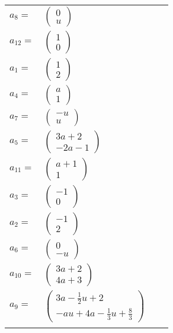\documentclass[1p]{elsarticle_modified}
\theoremstyle{definition}
\begin{document}
\begin{tabular}{m{7pt} m{180pt} m{7pt} m{180pt} }
\flushright $a_{8}=$&$\begin{pmatrix}0\\u\end{pmatrix}$ \\
\flushright $a_{12}=$&$\begin{pmatrix}1\\0\end{pmatrix}$ \\
\flushright $a_{1}=$&$\begin{pmatrix}1\\2\end{pmatrix}$ \\
\flushright $a_{4}=$&$\begin{pmatrix}a\\1\end{pmatrix}$ \\
\flushright $a_{7}=$&$\begin{pmatrix}- u\\u\end{pmatrix}$ \\
\flushright $a_{5}=$&$\begin{pmatrix}3 a+2\\-2 a-1\end{pmatrix}$ \\
\flushright $a_{11}=$&$\begin{pmatrix}a+1\\1\end{pmatrix}$ \\
\flushright $a_{3}=$&$\begin{pmatrix}-1\\0\end{pmatrix}$ \\
\flushright $a_{2}=$&$\begin{pmatrix}-1\\2\end{pmatrix}$ \\
\flushright $a_{6}=$&$\begin{pmatrix}0\\- u\end{pmatrix}$ \\
\flushright $a_{10}=$&$\begin{pmatrix}3 a+2\\4 a+3\end{pmatrix}$ \\
\flushright $a_{9}=$&$\begin{pmatrix}3 a-\frac{1}{2} u+2\\- a u+4 a-\frac{1}{3} u+\frac{8}{3}\end{pmatrix}$\\&\end{tabular}
\end{document}
